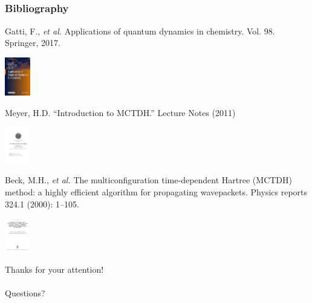 \documentclass{beamer}
\begin{document}
\subsection[Bibliography]{}\label{biblio}

\begin{frame}
  \frametitle{Bibliography}
  \centering
  \begin{minipage}{.6\linewidth}
\small{Gatti, F., \emph{et al.} Applications of quantum dynamics in chemistry. Vol. 98.
  Springer, 2017.}
\end{minipage}
\hspace{1cm}
  \begin{minipage}{.1\linewidth}
\includegraphics[width=3em]{appli.jpg}
\end{minipage}

\vspace{.5cm}

  \begin{minipage}{.6\linewidth}
\small{Meyer, H.D. ``Introduction to MCTDH.'' Lecture Notes (2011)}
 \end{minipage}
 \hspace{1cm}
   \begin{minipage}{.1\linewidth}
 \includegraphics[width=3em]{int_dan.pdf}
\end{minipage}
  
\vspace{.5cm}

  \begin{minipage}{.6\linewidth}
\small{Beck, M.H., \emph{et al.} The multiconfiguration time-dependent Hartree (MCTDH) method: a highly efficient algorithm for propagating wavepackets. Physics reports 324.1 (2000): 1--105.}
\end{minipage}
\hspace{1cm}
  \begin{minipage}{.1\linewidth}
\includegraphics[width=3em]{mctdh_rev.png}
  \end{minipage}
\end{frame}

\begin{frame}
  \centering \Large
  Thanks for your attention!  \\~\\
  Questions?
\end{frame}
\end{document}
